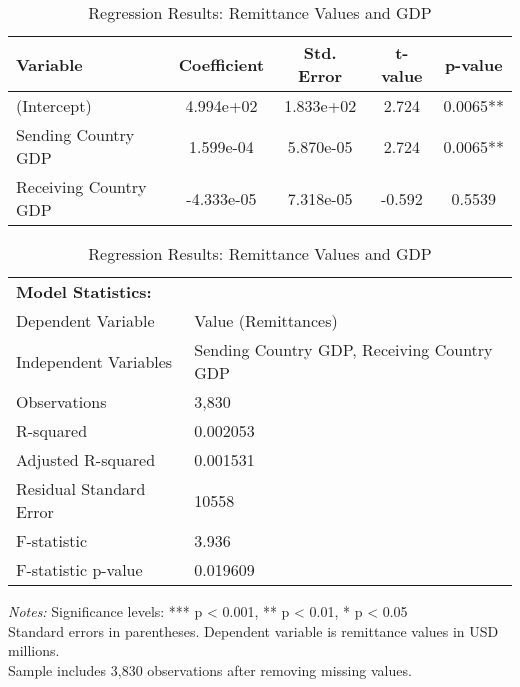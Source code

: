 
\begin{table}[htbp]
\centering
\caption{Regression Results: Remittance Values and GDP}
\label{tab:regression_results}
\begin{tabular}{lcccc}
\toprule
\textbf{Variable} & \textbf{Coefficient} & \textbf{Std. Error} & \textbf{t-value} & \textbf{p-value} \\
\midrule
(Intercept)          & 4.994e+02 & 1.833e+02 &   2.724 &  0.0065** \\
Sending Country GDP  & 1.599e-04 & 5.870e-05 &   2.724 &  0.0065** \\
Receiving Country GDP & -4.333e-05 & 7.318e-05 &  -0.592 &  0.5539 \\

\midrule
\end{tabular}

\vspace{0.3cm}

\begin{tabular}{ll}
\textbf{Model Statistics:} & \\
Dependent Variable & Value (Remittances) \\
Independent Variables & Sending Country GDP, Receiving Country GDP \\
Observations & 3,830 \\
R-squared & 0.002053 \\
Adjusted R-squared & 0.001531 \\
Residual Standard Error & 10558 \\
F-statistic & 3.936 \\
F-statistic p-value & 0.019609 \\
\end{tabular}

\vspace{0.2cm}
\begin{flushleft}
\textit{Notes:} Significance levels: *** p < 0.001, ** p < 0.01, * p < 0.05\\
Standard errors in parentheses. Dependent variable is remittance values in USD millions.\\
Sample includes 3,830 observations after removing missing values.
\end{flushleft}
\end{table}
